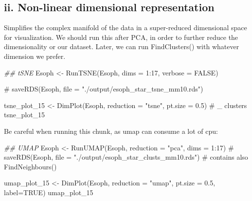 \documentclass[
  letterpaper,
  DIV=11,
  numbers=noendperiod]{scrreprt}
\newenvironment{Shaded}{\begin{snugshade}}{\end{snugshade}}
\newcommand{\AttributeTok}[1]{\textcolor[rgb]{0.40,0.45,0.13}{#1}}
\newcommand{\CommentTok}[1]{\textcolor[rgb]{0.37,0.37,0.37}{#1}}
\newcommand{\ConstantTok}[1]{\textcolor[rgb]{0.56,0.35,0.01}{#1}}
\newcommand{\DecValTok}[1]{\textcolor[rgb]{0.68,0.00,0.00}{#1}}
\newcommand{\DocumentationTok}[1]{\textcolor[rgb]{0.37,0.37,0.37}{\textit{#1}}}
\newcommand{\FloatTok}[1]{\textcolor[rgb]{0.68,0.00,0.00}{#1}}
\newcommand{\FunctionTok}[1]{\textcolor[rgb]{0.28,0.35,0.67}{#1}}
\newcommand{\NormalTok}[1]{\textcolor[rgb]{0.00,0.23,0.31}{#1}}
\newcommand{\OtherTok}[1]{\textcolor[rgb]{0.00,0.23,0.31}{#1}}
\newcommand{\SpecialCharTok}[1]{\textcolor[rgb]{0.37,0.37,0.37}{#1}}
\newcommand{\StringTok}[1]{\textcolor[rgb]{0.13,0.47,0.30}{#1}}
\begin{document}
\subsection{ii. Non-linear dimensional
representation}\label{ii.-non-linear-dimensional-representation}

Simplifies the complex manifold of the data in a super-reduced
dimensional space for visualization. We should run this after PCA, in
order to further reduce the dimensionality or our dataset. Later, we can
run FindClusters() with whatever dimension we prefer.

\begin{Shaded}
\begin{Highlighting}[]
\DocumentationTok{\#\# tSNE}
\NormalTok{Esoph }\OtherTok{\textless{}{-}} \FunctionTok{RunTSNE}\NormalTok{(Esoph, }\AttributeTok{dims =} \DecValTok{1}\SpecialCharTok{:}\DecValTok{17}\NormalTok{, }\AttributeTok{verbose =} \ConstantTok{FALSE}\NormalTok{)}

\CommentTok{\# saveRDS(Esoph, file = "./output/esoph\_star\_tsne\_mm10.rds")}

\NormalTok{tsne\_plot\_15 }\OtherTok{\textless{}{-}} \FunctionTok{DimPlot}\NormalTok{(Esoph, }\AttributeTok{reduction =} \StringTok{"tsne"}\NormalTok{, }\AttributeTok{pt.size =} \FloatTok{0.5}\NormalTok{) }\CommentTok{\# \_ clusters}
\NormalTok{tsne\_plot\_15}
\end{Highlighting}
\end{Shaded}

Be careful when running this chunk, as umap can consume a lot of cpu:

\begin{Shaded}
\begin{Highlighting}[]
\DocumentationTok{\#\# UMAP}
\NormalTok{Esoph }\OtherTok{\textless{}{-}} \FunctionTok{RunUMAP}\NormalTok{(Esoph, }\AttributeTok{reduction =} \StringTok{"pca"}\NormalTok{, }\AttributeTok{dims =} \DecValTok{1}\SpecialCharTok{:}\DecValTok{17}\NormalTok{)}
\CommentTok{\# saveRDS(Esoph, file = "./output/esoph\_star\_clusts\_mm10.rds") \# contains also FindNeighbours()}
\end{Highlighting}
\end{Shaded}

\begin{Shaded}
\begin{Highlighting}[]
\NormalTok{umap\_plot\_15 }\OtherTok{\textless{}{-}} \FunctionTok{DimPlot}\NormalTok{(Esoph, }\AttributeTok{reduction =} \StringTok{"umap"}\NormalTok{, }\AttributeTok{pt.size =} \FloatTok{0.5}\NormalTok{, }\AttributeTok{label=}\ConstantTok{TRUE}\NormalTok{)}
\NormalTok{umap\_plot\_15}
\end{Highlighting}
\end{Shaded}
\end{document}
